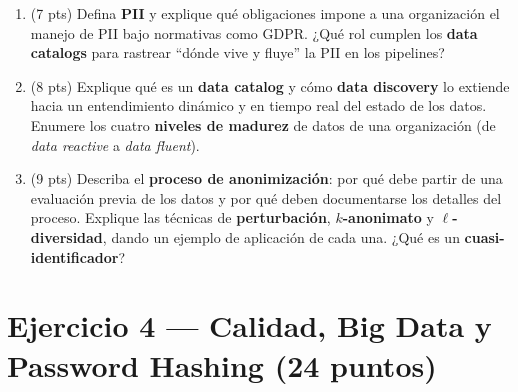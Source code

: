 \documentclass[11pt,a4paper]{article}
\begin{document}
\begin{enumerate}
  \item (7 pts) Defina \textbf{PII} y explique qué obligaciones impone a una organización el manejo de PII bajo normativas como GDPR. ¿Qué rol cumplen los \textbf{data catalogs} para rastrear ``dónde vive y fluye'' la PII en los pipelines?

  \vspace{4.5cm}

  \item (8 pts) Explique qué es un \textbf{data catalog} y cómo \textbf{data discovery} lo extiende hacia un entendimiento dinámico y en tiempo real del estado de los datos. Enumere los cuatro \textbf{niveles de madurez} de datos de una organización (de \textit{data reactive} a \textit{data fluent}).

  \vspace{5cm}

  \item (9 pts) Describa el \textbf{proceso de anonimización}: por qué debe partir de una evaluación previa de los datos y por qué deben documentarse los detalles del proceso. Explique las técnicas de \textbf{perturbación}, \textbf{$k$-anonimato} y \textbf{$\ell$-diversidad}, dando un ejemplo de aplicación de cada una. ¿Qué es un \textbf{cuasi-identificador}?

  \vspace{6cm}
\end{enumerate}

\newpage

\section*{Ejercicio 4 — Calidad, Big Data y Password Hashing \hfill\normalfont(24 puntos)}
\end{document}
